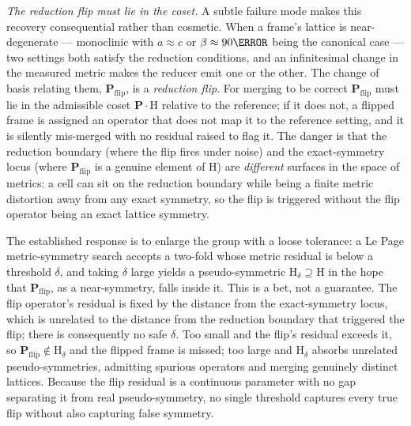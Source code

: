 \documentclass[11pt]{article}
\newcommand{\Pop}{\mathbf{P}}
\begin{document}
\emph{The reduction flip must lie in the coset.} A subtle failure mode makes this
recovery consequential rather than cosmetic. When a frame's lattice is
near-degenerate --- monoclinic with $a \approx c$ or $\beta \approx 90\degree$
being the canonical case --- two settings both satisfy the reduction conditions,
and an infinitesimal change in the measured metric makes the reducer emit one or
the other. The change of basis relating them, $\Pop_{\mathrm{flip}}$, is a
\emph{reduction flip}. For merging to be correct $\Pop_{\mathrm{flip}}$ must lie
in the admissible coset $\Pop\cdot\mathrm{H}$ relative to the reference; if it does
not, a flipped frame is assigned an operator that does not map it to the reference
setting, and it is silently mis-merged with no residual raised to flag it. The
danger is that the reduction boundary (where the flip fires under noise) and the
exact-symmetry locus (where $\Pop_{\mathrm{flip}}$ is a genuine element of
$\mathrm{H}$) are \emph{different} surfaces in the space of metrics: a cell can sit
on the reduction boundary while being a finite metric distortion away from any
exact symmetry, so the flip is triggered without the flip operator being an exact
lattice symmetry.

The established response is to enlarge the group with a loose tolerance: a Le Page
metric-symmetry search accepts a two-fold whose metric residual is below a
threshold $\delta$, and taking $\delta$ large yields a pseudo-symmetric
$\mathrm{H}_\delta \supseteq \mathrm{H}$ in the hope that $\Pop_{\mathrm{flip}}$,
as a near-symmetry, falls inside it. This is a bet, not a guarantee. The flip
operator's residual is fixed by the distance from the exact-symmetry locus, which
is unrelated to the distance from the reduction boundary that triggered the flip;
there is consequently no safe $\delta$. Too small and the flip's residual exceeds
it, so $\Pop_{\mathrm{flip}} \notin \mathrm{H}_\delta$ and the flipped frame is
missed; too large and $\mathrm{H}_\delta$ absorbs unrelated pseudo-symmetries,
admitting spurious operators and merging genuinely distinct lattices. Because the
flip residual is a continuous parameter with no gap separating it from real
pseudo-symmetry, no single threshold captures every true flip without also
capturing false symmetry.
\end{document}
